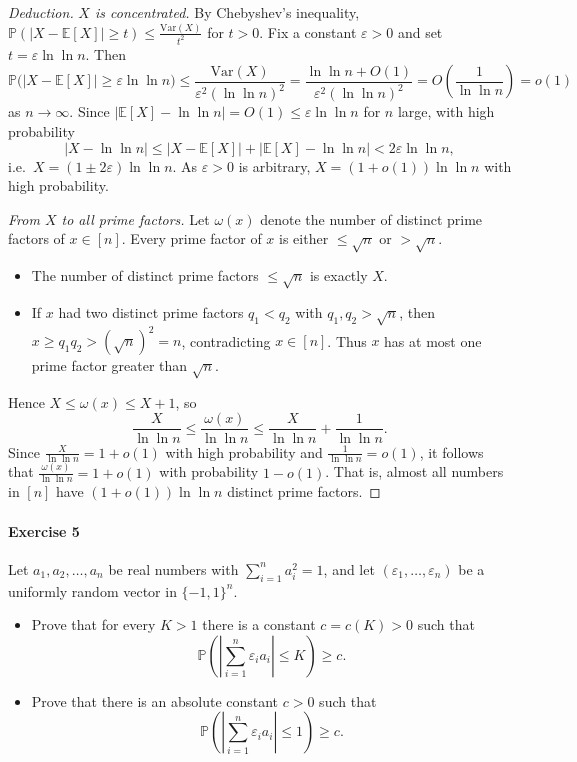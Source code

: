 \documentclass[a4paper,12pt]{article}
\newcommand{\eps}{\varepsilon}
\newcommand{\card}[1]{\left| #1 \right|}
\newcommand{\mb}[1]{\mathbb{#1}}
\begin{document}
\begin{proof}[Deduction]
	\emph{$X$ is concentrated.} By Chebyshev's inequality, $\mb P(\card{X - \mb E[X]} \ge t) \le \frac{\mathrm{Var}(X)}{t^2}$ for $t > 0$. Fix a constant $\eps > 0$ and set $t = \eps \ln \ln n$. Then
	\[
		\mb P\big( \card{X - \mb E[X]} \ge \eps \ln \ln n \big) \le \frac{\mathrm{Var}(X)}{\eps^2 (\ln \ln n)^2} = \frac{\ln \ln n + O(1)}{\eps^2 (\ln \ln n)^2} = O\left( \frac{1}{\ln \ln n} \right) = o(1)
	\]
	as $n \to \infty$. Since $\card{\mb E[X] - \ln \ln n} = O(1) \le \eps \ln \ln n$ for $n$ large, with high probability
	\[
		\card{X - \ln \ln n} \le \card{X - \mb E[X]} + \card{\mb E[X] - \ln \ln n} < 2\eps \ln \ln n,
	\]
	i.e.\ $X = (1 \pm 2\eps) \ln \ln n$. As $\eps > 0$ is arbitrary, $X = (1 + o(1)) \ln \ln n$ with high probability.

	\emph{From $X$ to all prime factors.} Let $\omega(x)$ denote the number of distinct prime factors of $x \in [n]$. Every prime factor of $x$ is either $\le \sqrt n$ or $> \sqrt n$.
	\begin{itemize}
		\item The number of distinct prime factors $\le \sqrt n$ is exactly $X$.
		\item If $x$ had two distinct prime factors $q_1 < q_2$ with $q_1, q_2 > \sqrt n$, then $x \ge q_1 q_2 > (\sqrt n)^2 = n$, contradicting $x \in [n]$. Thus $x$ has at most one prime factor greater than $\sqrt n$.
	\end{itemize}
	Hence $X \le \omega(x) \le X + 1$, so
	\[
		\frac{X}{\ln \ln n} \le \frac{\omega(x)}{\ln \ln n} \le \frac{X}{\ln \ln n} + \frac{1}{\ln \ln n}.
	\]
	Since $\frac{X}{\ln \ln n} = 1 + o(1)$ with high probability and $\frac{1}{\ln \ln n} = o(1)$, it follows that $\frac{\omega(x)}{\ln \ln n} = 1 + o(1)$ with probability $1 - o(1)$. That is, almost all numbers in $[n]$ have $(1 + o(1)) \ln \ln n$ distinct prime factors.
\end{proof}

\paragraph{Exercise 5}  Let $a_1, a_2, \hdots, a_n$ be real numbers with $\sum_{i=1}^n a_i^2 = 1$, and let $( \varepsilon_1, \hdots, \varepsilon_n)$ be a uniformly random vector in $\{-1,1\}^n$.
\begin{itemize}
	\item[(a)] Prove that for every $K > 1$ there is a constant $c = c(K) > 0$ such that 
	\[ \mathbb{P} \left( \card{ \sum_{i=1}^n \varepsilon_i a_i } \le K \right) \ge c. \]
	\item[(b)] Prove that there is an absolute constant $c > 0$ such that
	\[ \mathbb{P} \left( \card{ \sum_{i=1}^n \varepsilon_i a_i } \le 1 \right) \ge c. \]
\end{itemize}
\end{document}
